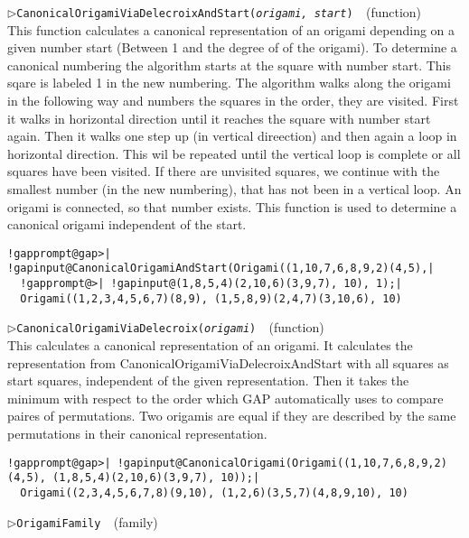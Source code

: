 \documentclass[a4paper,11pt]{report}
\begin{document}
{{{\begin{Verbatim}[commandchars=!@|,fontsize=\small,frame=single,label=Example]
\end{Verbatim}
 \noindent\textcolor{FuncColor}{$\triangleright$\enspace\texttt{CanonicalOrigamiViaDelecroixAndStart({\mdseries\slshape origami, start})
\label{CanonicalOrigamiViaDelecroixAndStart}
}\hfill{\scriptsize (function)}}\\


 This function calculates a canonical representation of an origami depending on
a given number start (Between 1 and the degree of of the origami). To
determine a canonical numbering the algorithm starts at the square with number
start. This sqare is labeled 1 in the new numbering. The algorithm walks along
the origami in the following way and numbers the squares in the order, they
are visited. First it walks in horizontal direction until it reaches the
square with number start again. Then it walks one step up (in vertical
direection) and then again a loop in horizontal direction. This wil be
repeated until the vertical loop is complete or all squares have been visited.
If there are unvisited squares, we continue with the smallest number (in the
new numbering), that has not been in a vertical loop. An origami is connected,
so that number exists. This function is used to determine a canonical origami
independent of the start. 
\begin{Verbatim}[commandchars=!@|,fontsize=\small,frame=single,label=Example]
  !gapprompt@gap>| !gapinput@CanonicalOrigamiAndStart(Origami((1,10,7,6,8,9,2)(4,5),|
  !gapprompt@>| !gapinput@(1,8,5,4)(2,10,6)(3,9,7), 10), 1);|
  Origami((1,2,3,4,5,6,7)(8,9), (1,5,8,9)(2,4,7)(3,10,6), 10)
\end{Verbatim}
 \noindent\textcolor{FuncColor}{$\triangleright$\enspace\texttt{CanonicalOrigamiViaDelecroix({\mdseries\slshape origami})
\label{CanonicalOrigamiViaDelecroix}
}\hfill{\scriptsize (function)}}\\


 This calculates a canonical representation of an origami. It calculates the
representation from CanonicalOrigamiViaDelecroixAndStart with all squares as
start squares, independent of the given representation. Then it takes the
minimum with respect to the order which \textsf{GAP} automatically uses to compare paires of permutations. Two origamis are equal
if they are described by the same permutations in their canonical
representation. 
\begin{Verbatim}[commandchars=!@|,fontsize=\small,frame=single,label=Example]
  !gapprompt@gap>| !gapinput@CanonicalOrigami(Origami((1,10,7,6,8,9,2)(4,5), (1,8,5,4)(2,10,6)(3,9,7), 10));|
  Origami((2,3,4,5,6,7,8)(9,10), (1,2,6)(3,5,7)(4,8,9,10), 10)
\end{Verbatim}
 \noindent\textcolor{FuncColor}{$\triangleright$\enspace\texttt{OrigamiFamily
\label{OrigamiFamily}
}\hfill{\scriptsize (family)}}\\


}}}
\end{document}
